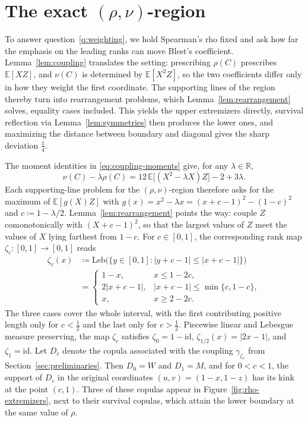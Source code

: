 \documentclass[11pt,a4paper]{article}
\theoremstyle{remark}
\newcommand{\E}{\mathbb{E}}
\newcommand{\R}{\mathbb{R}}
\newcommand{\1}{\mathbf{1}}
\begin{document}
\section{\texorpdfstring{The exact $(\rho,\nu)$-region}{The exact (rho,nu)-region}}
\label{sec:rho-nu}

To answer question~\ref{q:weighting}, we hold Spearman's rho fixed and ask how far the emphasis on the leading ranks can move Blest's coefficient.
Lemma~\ref{lem:coupling} translates the setting: prescribing $\rho(C)$ prescribes $\E[XZ]$, and $\nu(C)$ is determined by $\E[X^2Z]$, so the two coefficients differ only in how they weight the first coordinate.
The supporting lines of the region thereby turn into rearrangement problems, which Lemma~\ref{lem:rearrangement} solves, equality cases included.
This yields the upper extremizers directly, survival reflection via Lemma~\ref{lem:symmetries} then produces the lower ones, and maximizing the distance between boundary and diagonal gives the sharp deviation $\frac14$.

The moment identities in \eqref{eq:coupling-moments} give, for any $\lambda\in\R$,
\begin{equation}
  \label{eq:rho-nu-support}
  \nu(C)-\lambda\rho(C)=12\,\E\bigl[(X^2-\lambda X)Z\bigr]-2+3\lambda.
\end{equation}
Each supporting-line problem for the $(\rho,\nu)$-region therefore asks for the maximum of $\E[g(X)Z]$ with $g(x)=x^2-\lambda x=(x+c-1)^2-(1-c)^2$ and $c\coloneqq1-\lambda/2$.
Lemma~\ref{lem:rearrangement} points the way: couple $Z$ comonotonically with $(X+c-1)^2$, so that the largest values of $Z$ meet the values of $X$ lying farthest from $1-c$.
For $c\in[0,1]$, the corresponding rank map $\zeta_c:[0,1]\to[0,1]$ reads
\begin{equation}
  \label{eq:Zc-def}
  \begin{aligned}
  \zeta_c(x)&\coloneqq\mathrm{Leb}\bigl(\{y\in[0,1]:|y+c-1|\le|x+c-1|\}\bigr)\\
  &=
  \begin{cases}
    1-x, & x\le1-2c,\\
    2|x+c-1|, & |x+c-1|\le\min\{c,1-c\},\\
    x, & x\ge2-2c.
  \end{cases}
  \end{aligned}
\end{equation}
The three cases cover the whole interval, with the first contributing positive length only for $c<\frac12$ and the last only for $c>\frac12$.
Piecewise linear and Lebesgue measure preserving, the map $\zeta_c$ satisfies $\zeta_0=1-\mathrm{id}$, $\zeta_{1/2}(x)=|2x-1|$, and $\zeta_1=\mathrm{id}$.
Let $D_c$ denote the copula associated with the coupling $\gamma_{\zeta_c}$ from Section~\ref{sec:preliminaries}.
Then $D_0=W$ and $D_1=M$, and for $0<c<1$, the support of $D_c$ in the original coordinates $(u,v)=(1-x,1-z)$ has its kink at the point $(c,1)$.
Three of these copulas appear in Figure~\ref{fig:rho-extremizers}, next to their survival copulas, which attain the lower boundary at the same value of $\rho$.
\end{document}
